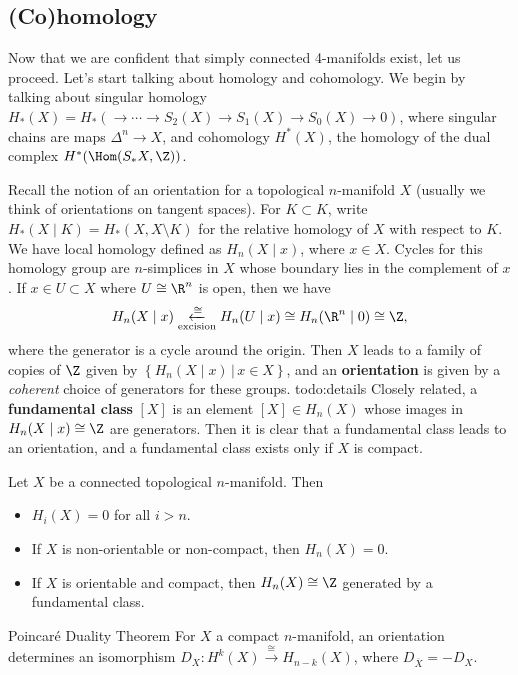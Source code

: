 \subsection{(Co)homology}
Now that we are confident that simply connected 4-manifolds exist, let us proceed. Let's start talking about homology and cohomology. We begin by talking about singular homology $H_*(X) = H_*( \to \cdots \to S_2(X) \to  S_1(X) \to S_0(X) \to 0)$, where singular chains are maps $\Delta ^n  \to X$, and cohomology $H^*(X)$, the homology of the dual complex $H^*(\Hom(S_*X, \Z))$.

Recall the notion of an orientation for a topological $n$-manifold $X$ (usually we think of orientations on tangent spaces). For $K \subset K$, write $H_*( X \mid K) = H_*(X, X \setminus K)$ for the relative homology of $X$ with respect to $K$. We have local homology defined as $H_n (X \mid x)$, where $x \in X$. Cycles for this homology group are $n$-simplices in $X$ whose boundary lies in the complement of $x$. If $x \in  U \subset X$ where $U \cong \R^n $ is open, then we have \[
    H_n (X \mid x) \underset{\text{excision} }{\xleftarrow{\cong} } H_n (U \mid x) \cong H_n (\R^n  \mid 0) \cong \Z,
\] where the generator is a cycle around the origin. Then $X$ leads to a family of copies of $\Z$ given by $\left\{H_n (X \mid x) \, \big| \, x \in X\right\} $, and an \textbf{orientation} is given by a \emph{coherent} choice of generators for these groups. {\color{red}todo:details} 
Closely related, a \textbf{fundamental class} $[X]$ is an element $[X] \in  H_n (X)$ whose images in $H_n (X \mid x) \cong \Z$ are generators. Then it is clear that a fundamental class leads to an orientation, and a fundamental class exists only if $X$ is compact. 
\begin{theorem}
    Let $X$ be a connected topological $n$-manifold. Then
    \begin{itemize}
    \setlength\itemsep{-.2em}
        \item $H_i (X) = 0$ for all $i >n$.
        \item If $X$ is non-orientable or non-compact, then $H_n (X) = 0$.
        \item If $X$ is orientable and compact, then $H_n (X) \cong \Z$ generated by a fundamental class.
    \end{itemize}
\end{theorem}
\begin{namedthm}{Poincar\'e Duality Theorem} 
    For $X$ a compact $n$-manifold, an orientation determines an isomorphism  $D_X \colon H^k (X) \xrightarrow{\cong}  H_{n-k} (X)$, where $D _{\overline{X}}= -D_X$.
\end{namedthm}
